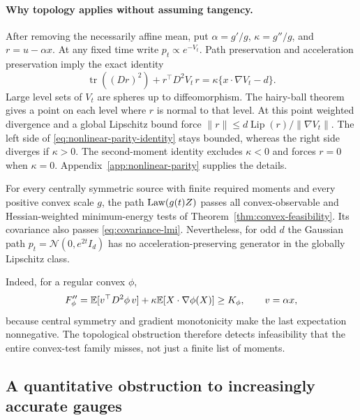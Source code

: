 \paragraph{Why topology applies without assuming tangency.}
After removing the necessarily affine mean, put
$\alpha=g'/g$, $\kappa=g''/g$, and $r=u-\alpha x$.
At any fixed time write $p_t\propto e^{-V_t}$.  Path preservation and
acceleration preservation imply the exact identity
\begin{equation}
 \operatorname{tr}((Dr)^2)+r^\top D^2V_t\,r
 =\kappa\{x\cdot\nabla V_t-d\}.
 \label{eq:nonlinear-parity-identity}
\end{equation}
Large level sets of $V_t$ are spheres up to diffeomorphism.
The hairy-ball theorem gives a point on each level where $r$ is normal
to that level.  At this point weighted divergence and a global
Lipschitz bound force $\|r\|\le d\operatorname{Lip}(r)/\|\nabla V_t\|$.
The left side of \eqref{eq:nonlinear-parity-identity} stays bounded,
whereas the right side diverges if $\kappa>0$.
The second-moment identity excludes $\kappa<0$ and forces $r=0$ when
$\kappa=0$.  Appendix~\ref{app:nonlinear-parity} supplies the details.

\begin{corollary}
\label{cor:convex-hierarchy-insufficient}
For every centrally symmetric source with finite required moments and
every positive convex scale $g$, the path $\operatorname{Law}(g(t)Z)$ passes all
convex-observable and Hessian-weighted minimum-energy tests of
Theorem~\ref{thm:convex-feasibility}.  Its covariance also passes
\eqref{eq:covariance-lmi}.  Nevertheless, for odd $d$ the Gaussian path
$p_t=\mathcal N(0,e^{2t}I_d)$ has no acceleration-preserving generator in
the globally Lipschitz class.
\end{corollary}

Indeed, for a regular convex $\phi$,
\[
 F_\phi''=\mathbb E[v^\top D^2\phi\,v]
       +\kappa\mathbb E[X\cdot\nabla\phi(X)]\ge K_\phi,
 \qquad v=\alpha x,
\]
because central symmetry and gradient monotonicity make the last
expectation nonnegative.  The topological obstruction therefore detects
infeasibility that the entire convex-test family misses, not just a
finite list of moments.

\subsection{A quantitative obstruction to increasingly accurate gauges}

